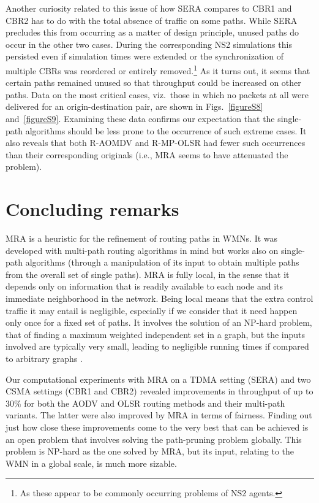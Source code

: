 \documentclass{article}
\begin{document}
Another curiosity related to this issue of how SERA compares to CBR1 and CBR2
has to do with the total absence of traffic on some paths. While SERA precludes
this from occurring as a matter of design principle, unused paths do occur in
the other two cases. During the corresponding NS2 simulations this persisted
even if simulation times were extended or the synchronization of multiple CBRs
was reordered or entirely removed.\footnote{As these appear to be commonly
occurring problems of NS2 agents.} As it turns out, it seems that certain paths
remained unused so that throughput could be increased on other paths. Data on
the most critical cases, viz.\ those in which no packets at all were delivered
for an origin-destination pair, are shown in Figs.~\ref{figureS8}
and~\ref{figureS9}. Examining these data confirms our expectation that the
single-path algorithms should be less prone to the occurrence of such extreme
cases. It also reveals that both R-AOMDV and R-MP-OLSR had fewer such
occurrences than their corresponding originals (i.e., MRA seems to have
attenuated the problem).

\section{Concluding remarks}\label{sec:conclusion}

MRA is a heuristic for the refinement of routing paths in WMNs. It was developed
with multi-path routing algorithms in mind but works also on single-path
algorithms (through a manipulation of its input to obtain multiple paths from
the overall set of single paths). MRA is fully local, in the sense that it
depends only on information that is readily available to each node and its
immediate neighborhood in the network. Being local means that the extra control
traffic it may entail is negligible, especially if we consider that it need
happen only once for a fixed set of paths. It involves the solution of an
NP-hard problem, that of finding a maximum weighted independent set in a graph,
but the inputs involved are typically very small, leading to negligible running
times if compared to arbitrary graphs \cite{Pardalos1991}.

Our computational experiments with MRA on a TDMA setting (SERA) and two CSMA
settings (CBR1 and CBR2) revealed improvements in throughput of up to $30\%$ for
both the AODV and OLSR routing methods and their multi-path variants. The latter
were also improved by MRA in terms of fairness. Finding out just how close these
improvements come to the very best that can be achieved is an open problem that
involves solving the path-pruning problem globally. This problem is NP-hard as
the one solved by MRA, but its input, relating to the WMN in a global scale, is
much more sizable.
\end{document}
